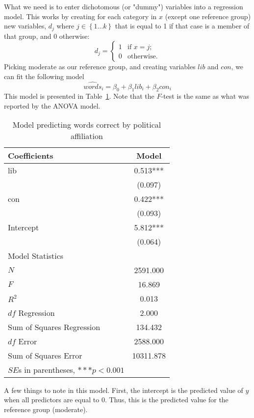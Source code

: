 What we need is to enter dichotomous (or "dummy") variables into a regression model. This works by creating for each category in $x$ (except one reference group) new variables, $d_j$ where $j\in\left\{1 \ldots k\right\}$ that is equal to 1 if that case is a member of that group, and 0 otherwise:
\begin{equation}
d_j = \left\{ \begin{array}{ll}
     1 & \mbox{if $x = j$};\\
     0 & \mbox{otherwise}.\end{array} \right.
\end{equation}
Picking moderate as our reference group, and creating variables $lib$ and $con$, we can fit the following model
\[
\widehat{words}_i=\beta_0+\beta_1lib_i+\beta_2con_i
\]
This model is presented in Table~\ref{tab:wordmodel}. Note that the $F$-test is the same as what was reported by the ANOVA model.
\begin{table}[htbp]\centering
 \caption{Model predicting words correct by political affiliation
\label{tab:wordmodel}}
\begin{tabular}{lc}
\hline
Coefficients      &    Model  \\ \hline
lib &    0.513***\\
      &   (0.097)  \\
con &    0.422***\\
      &   (0.093)  \\
Intercept    &    5.812***\\
      &   (0.064)  \\
\hline
\multicolumn{1}{l}{Model Statistics} \\
\hline
$N$          &   2591.000  \\
$F$          &   16.869  \\
$R^2$        &    0.013  \\
$df$ Regression      &    2.000  \\
Sum of Squares Regression     &  134.432  \\
$df$ Error    &   2588.000  \\
Sum of Squares Error    &  10311.878  \\
\hline
\multicolumn{1}{l}{$SE$s in parentheses, $***p<0.001$} \\
\hline
\end{tabular}
\end{table}
A few things to note in this model. First, the intercept is the predicted value of $y$ when all predictors are equal to 0. Thus, this is the predicted value for the reference group (moderate).

